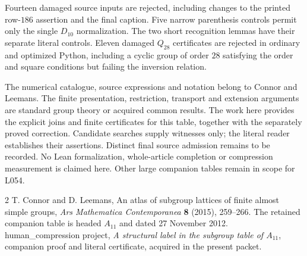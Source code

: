 \documentclass[11pt]{article}
\begin{document}
Fourteen damaged source inputs are rejected, including changes to the
printed row-$186$ assertion and the final caption. Five narrow parenthesis
controls permit only the single $D_{10}$ normalization. The two short
recognition lemmas have their separate literal controls. Eleven damaged
$Q_{28}$ certificates are rejected in ordinary and optimized Python,
including a cyclic group of order $28$ satisfying the order and square
conditions but failing the inversion relation.

The numerical catalogue, source expressions and notation belong to
Connor and Leemans. The finite presentation, restriction, transport and
extension arguments are standard group theory or acquired common results.
The work here provides the explicit joins and finite certificates for
this table, together with the separately proved correction. Candidate
searches supply witnesses only; the literal reader establishes their
assertions. Distinct final source admission remains to be recorded.
No Lean formalization, whole-article completion or compression measurement
is claimed here. Other large companion tables remain in scope for L054.

\begin{thebibliography}{2}
 T. Connor and D. Leemans,
An atlas of subgroup lattices of finite almost simple groups,
\emph{Ars Mathematica Contemporanea} \textbf{8} (2015), 259--266.
The retained companion table is headed $A_{11}$ and dated 27 November 2012.
 human\_compression project,
\emph{A structural label in the subgroup table of $A_{11}$},
companion proof and literal certificate, acquired in the present packet.
\end{thebibliography}
\end{document}
